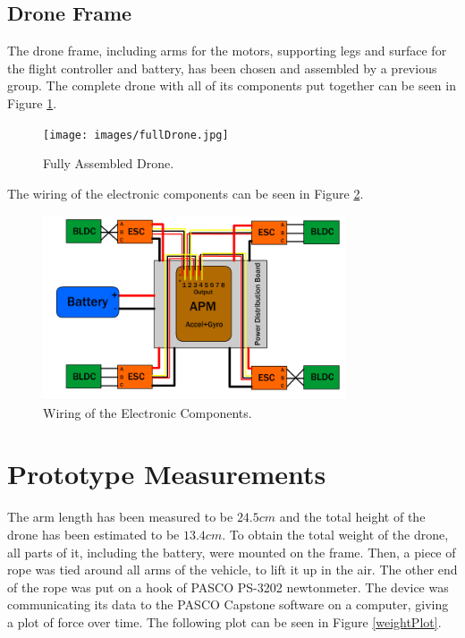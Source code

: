 \subsection{Drone Frame}
The drone frame, including arms for the motors, supporting legs and surface for the flight controller and battery, has been chosen and assembled by a previous group. The complete drone with all of its components put together can be seen in Figure \ref{fullDrone}.

\begin{figure}[H]
  \centering
    \texttt{[image: images/fullDrone.jpg]}
	\caption{Fully Assembled Drone.}
	\label{fullDrone}
\end{figure}

The wiring of the electronic components can be seen in Figure \ref{wiring}.
\begin{figure}[H]
  \centering
    \includegraphics[width=0.8\textwidth]{images/Wiring2.png}
	\caption{Wiring of the Electronic Components.}
	\label{wiring}
\end{figure}

\section{Prototype Measurements}
The arm length has been measured to be $24.5 cm$ and the total height of the drone has been estimated to be $13.4 cm$.
To obtain the total weight of the drone, all parts of it, including the battery, were mounted on the frame. Then, a piece of rope was tied around all arms of the vehicle, to lift it up in the air. The other end of the rope was put on a hook of PASCO PS-3202 newtonmeter. The device was communicating its data to the PASCO Capstone software on a computer, giving a plot of force over time. The following plot can be seen in Figure \ref{weightPlot}.

